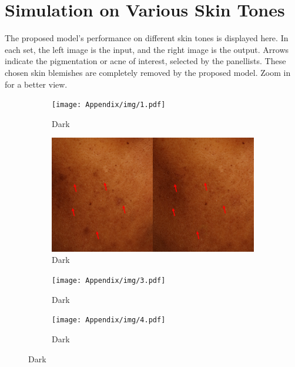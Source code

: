 
\begin{appendices}
\label{cha:appendices}

\chapter{Simulation on Various Skin Tones}
\begin{spacing}{1.5}
\vspace{-2em}
The proposed model's performance on different skin tones is displayed here. In each set, the left image is the input, and the right image is the output. Arrows indicate the pigmentation or acne of interest, selected by the panellists. These chosen skin blemishes are completely removed by the proposed model. Zoom in for a better view.
\begin{figure}[h]
    \begin{subfigure}{.5\textwidth}
        \centering
        \texttt{[image: Appendix/img/1.pdf]}
        \caption{Dark}
      \end{subfigure}%
      \begin{subfigure}{.5\textwidth}
        \centering
        \includegraphics[width=.9\linewidth]{Appendix/img/2.pdf}
        \caption{Dark}
      \end{subfigure}
    \begin{subfigure}{.5\textwidth}
        \centering
        \texttt{[image: Appendix/img/3.pdf]}
        \caption{Dark}
      \end{subfigure}%
      \begin{subfigure}{.5\textwidth}
        \centering
        \texttt{[image: Appendix/img/4.pdf]}
        \caption{Dark}
      \end{subfigure}

\end{figure}
\end{spacing}
\end{appendices}

